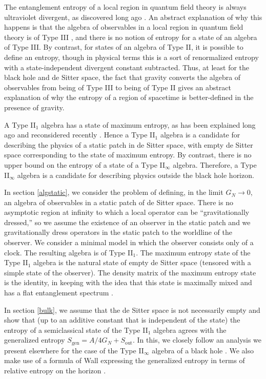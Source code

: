 \documentclass[11pt,a4paper]{article}
\def\gen{{\mathrm{gen}}}
\def\out{{\mathrm{out}}}
\begin{document}
  The entanglement entropy of a local region in quantum field theory is always ultraviolet divergent, as discovered long ago   \cite{Sorkin, BKLS}.
  An abstract explanation of why this happens is that the algebra of observables in a local region in quantum field theory is of Type III \cite{Araki},
  and there is no notion of entropy for a state of an algebra of Type III.   By contrast, for states of an algebra of Type II, it is possible to define an entropy,
  though in physical terms this is a sort of renormalized entropy with a state-independent divergent constant subtracted.   Thus, at least
  for the black hole and de Sitter space, the fact that gravity converts the algebra of observables from being of Type III to being of Type II gives an abstract explanation
  of why the entropy of a region of spacetime is better-defined in the presence of gravity.   
  
  A Type II$_1$ algebra has a state of maximum entropy, as has been explained long ago \cite{Segal}
  and  reconsidered recently \cite{LongoWitten}.  Hence a Type II$_1$ algebra is a candidate for describing the physics of a static patch in de Sitter space,
  with empty de Sitter space corresponding to the state of maximum entropy.     By contrast, there is no upper bound on the entropy of a state of a Type II$_\infty$
  algebra.   Therefore, a Type II$_\infty$ algebra is a  candidate for describing physics outside the black hole horizon.  
  
  In section \ref{algstatic}, we consider the problem of defining, in the limit $G_N\to 0$, an algebra of observables in a static patch of de Sitter space.   
  There is no asymptotic region at infinity to which a local operator can be ``gravitationally dressed,'' so we assume the existence of an observer in the static
  patch and we gravitationally dress operators in the static patch to the worldline of the observer.   We consider a minimal model in which the observer consists
  only of a clock.   The resulting algebra is of Type II$_1$.   The maximum entropy state of the Type II$_1$ algebra is the natural state of empty de Sitter space
  (tensored with a simple state of the observer).     The density matrix of the maximum entropy state is the identity, in keeping with the idea that this
  state is maximally mixed and has a flat entanglement spectrum \cite{DST}.
  
  In section \ref{bulk}, we assume that the de Sitter space is not necessarily empty and show that (up to an additive constant that is independent of the state)
  the entropy of a semiclassical state of the Type II$_1$ algebra agrees with the generalized entropy $S_\gen=A/4G_N+S_\out$.    In this, we closely follow an analysis we
  present elsewhere for the case of the Type II$_\infty$ algebra of a black hole  \cite{CPW}.
  We also make use of a formula of Wall expressing the generalized entropy in terms of relative entropy on the horizon \cite{Wall}.
  
\end{document}
